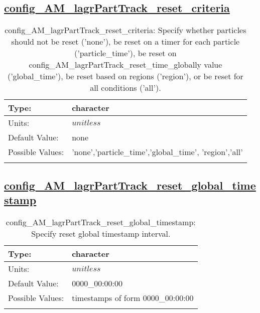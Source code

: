\subsection[config\_AM\_lagrPartTrack\_reset\_criteria]{\hyperref[sec:nm_tab_AM_lagrPartTrack]{config\_AM\_lagrPartTrack\_reset\_criteria}}
\label{subsec:nm_sec_config_AM_lagrPartTrack_reset_criteria}
\begin{center}
\begin{longtable}{| p{2.0in} || p{4.0in} |}
    \hline
    Type: & character \\
    \hline
    Units: & $unitless$ \\
    \hline
    Default Value: & none \\
    \hline
    Possible Values: & 'none','particle\_time','global\_time', 'region','all' \\
    \hline
    \caption{config\_AM\_lagrPartTrack\_reset\_criteria: Specify whether particles should not be reset ('none'), be reset on a timer for each particle ('particle\_time'), be reset on config\_AM\_lagrPartTrack\_reset\_time\_globally value ('global\_time'), be reset based on regions ('region'), or be reset for all conditions ('all').}
\end{longtable}
\end{center}
\subsection[config\_AM\_lagrPartTrack\_reset\_global\_timestamp]{\hyperref[sec:nm_tab_AM_lagrPartTrack]{config\_AM\_lagrPartTrack\_reset\_global\_timestamp}}
\label{subsec:nm_sec_config_AM_lagrPartTrack_reset_global_timestamp}
\begin{center}
\begin{longtable}{| p{2.0in} || p{4.0in} |}
    \hline
    Type: & character \\
    \hline
    Units: & $unitless$ \\
    \hline
    Default Value: & 0000\_00:00:00 \\
    \hline
    Possible Values: & timestamps of form 0000\_00:00:00 \\
    \hline
    \caption{config\_AM\_lagrPartTrack\_reset\_global\_timestamp: Specify reset global timestamp interval.}
\end{longtable}
\end{center}
